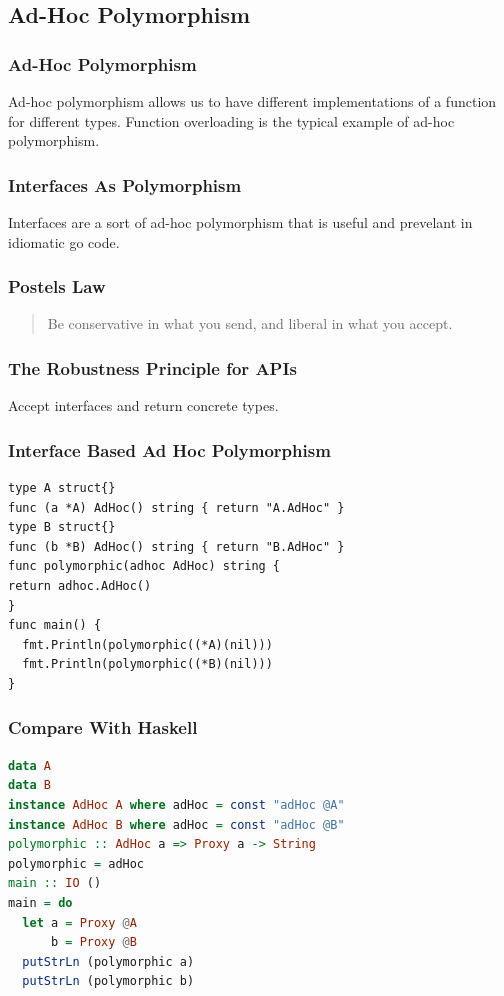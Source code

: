 \documentclass{beamer}
\begin{document}
\subsection{Ad-Hoc Polymorphism}
\begin{frame}
  \frametitle{Ad-Hoc Polymorphism}
  Ad-hoc polymorphism allows us to have different implementations of a
  function for different types.  Function overloading is the typical
  example of ad-hoc polymorphism.
\end{frame}

\begin{frame}
  \frametitle{Interfaces As Polymorphism}
  Interfaces are a sort of ad-hoc polymorphism that is useful and prevelant
  in idiomatic go code.\\\vspace{2mm}
\end{frame}

\begin{frame}
  \frametitle{Postels Law}
  \begin{quote}
    Be conservative in what you send, and liberal in what you accept.
  \end{quote}
\end{frame}

\begin{frame}
  \frametitle{The Robustness Principle for APIs}
  Accept interfaces and return concrete types.
\end{frame}

\begin{frame}[fragile]
  \frametitle{Interface Based Ad Hoc Polymorphism}
\begin{lstlisting}[language=Golang]
% type AdHoc interface {AdHoc() string}
type A struct{}
func (a *A) AdHoc() string { return "A.AdHoc" }
type B struct{}
func (b *B) AdHoc() string { return "B.AdHoc" }
func polymorphic(adhoc AdHoc) string {
return adhoc.AdHoc()
}
func main() {
  fmt.Println(polymorphic((*A)(nil)))
  fmt.Println(polymorphic((*B)(nil)))
}
\end{lstlisting}
\end{frame}

\begin{frame}[fragile]
  \frametitle{Compare With Haskell}
\begin{lstlisting}[language=Haskell]
% class AdHoc a where adHoc :: Proxy a -> String
data A
data B
instance AdHoc A where adHoc = const "adHoc @A"
instance AdHoc B where adHoc = const "adHoc @B"
polymorphic :: AdHoc a => Proxy a -> String
polymorphic = adHoc
main :: IO ()
main = do
  let a = Proxy @A
      b = Proxy @B
  putStrLn (polymorphic a)
  putStrLn (polymorphic b)
\end{lstlisting}
\end{frame}
\end{document}
